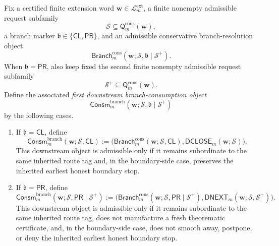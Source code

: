\begin{definition}
\label{def:first-downstream-branch-consumption-object-second-level}
Fix a certified finite extension word \(\mathbf w\in\mathcal L^{\mathrm{ext}}_{m}\), a finite nonempty admissible request subfamily
\[
  \mathcal S \subseteq \mathsf{Q}^{\mathrm{cons}}_{m}(\mathbf w),
\]
a branch marker \(\mathfrak b\in\{\mathsf{CL},\mathsf{PR}\}\), and an admissible conservative branch-resolution object
\[
  \mathsf{Branch}^{\mathrm{cons}}_{m}(\mathbf w;\mathcal S,\mathfrak b\mid\mathcal S^{+}).
\]
When \(\mathfrak b=\mathsf{PR}\), also keep fixed the second finite nonempty admissible request subfamily
\[
  \mathcal S^{+}\subseteq \mathsf{Q}^{\mathrm{cons}}_{m}(\mathbf w).
\]
Define the associated \emph{first downstream branch-consumption object}
\[
  \mathsf{Consm}^{\mathrm{branch}}_{m}(\mathbf w;\mathcal S,\mathfrak b\mid\mathcal S^{+})
\]
by the following cases.
\begin{enumerate}[label=(\roman*)]
  \item If \(\mathfrak b=\mathsf{CL}\), define
\[
  \mathsf{Consm}^{\mathrm{branch}}_{m}(\mathbf w;\mathcal S,\mathsf{CL})
  :=
  \bigl(\mathsf{Branch}^{\mathrm{cons}}_{m}(\mathbf w;\mathcal S,\mathsf{CL}),\mathsf{DCLOSE}_{m}(\mathbf w;\mathcal S)\bigr).
\]
This downstream object is admissible only if it remains subordinate to the same inherited route tag and, in the boundary-side case, preserves the inherited earliest honest boundary stop.

  \item If \(\mathfrak b=\mathsf{PR}\), define
\[
  \mathsf{Consm}^{\mathrm{branch}}_{m}(\mathbf w;\mathcal S,\mathsf{PR}\mid\mathcal S^{+})
  :=
  \bigl(\mathsf{Branch}^{\mathrm{cons}}_{m}(\mathbf w;\mathcal S,\mathsf{PR}\mid\mathcal S^{+}),\mathsf{DNEXT}_{m}(\mathbf w;\mathcal S,\mathcal S^{+})\bigr).
\]
This downstream object is admissible only if it remains subordinate to the same inherited route tag, does not manufacture a fresh theorematic certificate, and, in the boundary-side case, does not smooth away, postpone, or deny the inherited earliest honest boundary stop.
\end{enumerate}
\end{definition}

